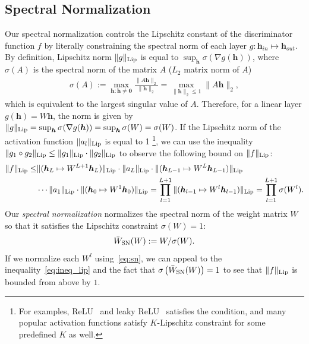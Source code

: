 \documentclass{article}
\newcommand{\bmh}{{\bm h}}
\begin{document}
\subsection{\label{subsec:SN}Spectral Normalization}
Our spectral normalization controls the Lipschitz constant of the discriminator function $f$ by literally constraining the spectral norm of each layer $g: \bmh_{in} \mapsto \bmh_{out}$. By definition, Lipschitz norm $\|g\|_{\rm Lip}$ is equal to $\sup_\bmh \sigma(\nabla g(\bmh))$, where $\sigma(A)$ is the spectral norm of the matrix $A$ ($L_2$ matrix norm of $A$)
\begin{align}
	\sigma(A) := \max_{\bmh: \bmh \neq {\bm 0}} \frac{\|A\bmh\|_2}{\|\bmh\|_2} = \max_{\|\bmh\|_2\leq 1} \|A\bmh\|_2, \label{eq:spnorm}
\end{align}
which is equivalent to the largest singular value of $A$.
Therefore, for a linear layer $g(\bmh) = W\bmh$, the norm is given by $\|g\|_{\rm Lip} = \sup_\bmh \sigma(\nabla g(\bmh)) = \sup_\bmh \sigma(W) = \sigma(W) $.
If the Lipschitz norm of the activation function $\|a_l\|_{\rm Lip}$ is equal to 1 \footnote{For examples, ReLU~\cite[]{jarrett2009best,nair2010rectified, glorot2011deep} and leaky ReLU~\cite[]{maas2013rectifier} satisfies the condition, and many popular activation functions satisfy $K$-Lipschitz constraint for some predefined $K$ as well.}, we can use the inequality $\|g_1\circ g_2\|_{\rm Lip}\leq\|g_1\|_{\rm Lip}\cdot\|g_2\|_{\rm Lip}$ to observe the following bound on $\|f\|_{\rm Lip}$:
\begin{align}
 	\|f\|_{\rm Lip} \leq & \|(\bmh_{L}\mapsto W^{L+1}\bmh_{L})\|_{\rm Lip}\cdot \|a_L\|_{\rm Lip}\cdot\|(\bmh_{L-1}\mapsto W^ L\bmh_{L-1})\|_{\rm Lip} \nonumber \\
    &\cdots \|a_1\|_{\rm Lip}\cdot\|(\bmh_0\mapsto W^ 1\bmh_0)\|_{\rm Lip} 
      = \prod_{l=1}^{L+1} \|(\bmh_{l-1}\mapsto W^l\bmh_{l-1})\|_{\rm Lip} = \prod_{l=1}^{L+1} \sigma(W^l). \label{eq:ineq_lip}
\end{align}
Our \textit{spectral normalization} normalizes the spectral norm of the weight matrix $W$ so that it satisfies the Lipschitz constraint $\sigma(W) = 1$:
\begin{align}
\bar{W}_{\rm SN}(W) := W / \sigma(W) \label{eq:sn}.
\end{align}
If we normalize each $W^l$ using~\eqref{eq:sn}, we can appeal to the inequality~\eqref{eq:ineq_lip} and the fact that $\sigma\left(\bar{W}_{\rm SN}(W)\right) = 1$ to see that $\|f\|_{\rm Lip}$ is bounded from above by $1$.
\end{document}

